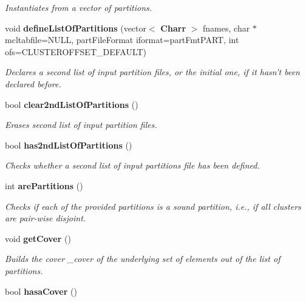 \begin{CompactItemize}
\begin{CompactList}\small\item\em Instantiates from a vector of partitions. \item\end{CompactList}\item 
void {\bf define\-List\-Of\-Partitions} (vector$<$ {\bf Charr} $>$ fnames, char $\ast$mcltabfile=NULL, part\-File\-Format iformat=part\-Fmt\-PART, int ofs=CLUSTEROFFSET\_\-DEFAULT)\label{classPartitionStats_a4}

\begin{CompactList}\small\item\em Declares a second list of input partition files, or the initial one, if it hasn't been declared before. \item\end{CompactList}\item 
bool {\bf clear2nd\-List\-Of\-Partitions} ()\label{classPartitionStats_a5}

\begin{CompactList}\small\item\em Erases second list of input partition files. \item\end{CompactList}\item 
bool {\bf has2nd\-List\-Of\-Partitions} ()\label{classPartitionStats_a6}

\begin{CompactList}\small\item\em Checks whether a second list of input partitions file has been defined. \item\end{CompactList}\item 
int {\bf are\-Partitions} ()\label{classPartitionStats_a7}

\begin{CompactList}\small\item\em Checks if each of the provided partitions is a sound partition, i.e., if all clusters are pair-wise disjoint. \item\end{CompactList}\item 
void {\bf get\-Cover} ()\label{classPartitionStats_a8}

\begin{CompactList}\small\item\em Builds the cover \_\-cover of the underlying set of elements out of the list of partitions. \item\end{CompactList}\item 
bool {\bf hasa\-Cover} ()\label{classPartitionStats_a9}


\end{CompactItemize}
